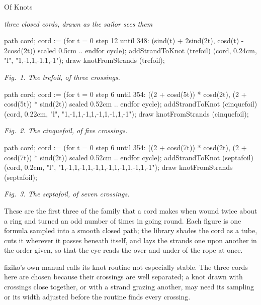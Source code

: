 \documentclass[11pt]{article}
\newcommand{\knotcell}[2]{%
  \begin{minipage}[t]{.31\linewidth}
    \centering
    \begin{mplibcode}
      #1
    \end{mplibcode}\par
    \vspace{.5em}
    {\small\itshape #2}
  \end{minipage}%
}
\begin{document}
\begin{center}
  {\small{}}\par
  \vspace{.3em}
  {\Large Of Knots}\par
  \vspace{.2em}
  {\itshape three closed cords, drawn as the sailor sees them}
\end{center}

\vspace{1.4em}

\knotcell{
  path cord;
  cord := (for t = 0 step 12 until 348:
    (sind(t) + 2sind(2t), cosd(t) - 2cosd(2t)) scaled 0.5cm .. endfor cycle);
  addStrandToKnot (trefoil) (cord, 0.24cm, "l", "1,-1,1,-1,1,-1");
  draw knotFromStrands (trefoil);
}{Fig.\ 1. The trefoil, of three crossings.}
\hfill
\knotcell{
  path cord;
  cord := (for t = 0 step 6 until 354:
    ((2 + cosd(5t)) * cosd(2t), (2 + cosd(5t)) * sind(2t)) scaled 0.52cm
    .. endfor cycle);
  addStrandToKnot (cinquefoil) (cord, 0.22cm, "l", "1,-1,1,-1,1,-1,1,-1,1,-1");
  draw knotFromStrands (cinquefoil);
}{Fig.\ 2. The cinquefoil, of five crossings.}
\hfill
\knotcell{
  path cord;
  cord := (for t = 0 step 6 until 354:
    ((2 + cosd(7t)) * cosd(2t), (2 + cosd(7t)) * sind(2t)) scaled 0.52cm
    .. endfor cycle);
  addStrandToKnot (septafoil) (cord, 0.2cm, "l",
    "1,-1,1,-1,1,-1,1,-1,1,-1,1,-1,1,-1");
  draw knotFromStrands (septafoil);
}{Fig.\ 3. The septafoil, of seven crossings.}

\vspace{1.6em}
\small
These are the first three of the family that a cord makes when wound twice
about a ring and turned an odd number of times in going round. Each figure
is one formula sampled into a smooth closed path; the library shades the cord
as a tube, cuts it wherever it passes beneath itself, and lays the strands
one upon another in the order given, so that the eye reads the over and under
of the rope at once.

\vspace{.6em}
\footnotesize
fiziko's own manual calls its knot routine not especially stable. The three
cords here are chosen because their crossings are well separated; a knot
drawn with crossings close together, or with a strand grazing another, may
need its sampling or its width adjusted before the routine finds every
crossing.
\end{document}
